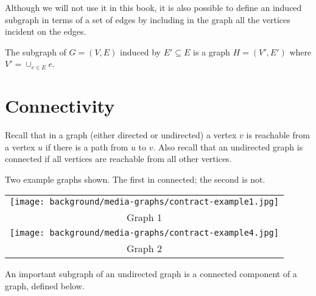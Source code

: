 \begin{cluster}
\label{grp:grm:bg::graphs::although}

\begin{gram}
\label{grm:bg::graphs::although}
Although we will not use it in this book, it is also possible to
define an induced subgraph in terms of a set of edges by including in
the graph all the vertices incident on the edges.

\end{gram}
\end{cluster}

\begin{cluster}
\label{grp:def:bg::graphs::subgraph::ei}

\begin{definition}
\label{def:bg::graphs::subgraph::ei}
The subgraph of $G = (V,E)$ induced by $E' \subseteq E$ is a graph $H
= (V',E')$ where $V' = \cup_{e \in E} e$.

\end{definition}
\end{cluster}


\section{Connectivity}
\label{sec:bg::graphs::connectivity}

\begin{cluster}
\label{grp:grm:bg::graphs::recall}

\begin{gram}
\label{grm:bg::graphs::recall}
Recall that in a graph (either directed or undirected) a vertex $v$ is
reachable from a vertex $u$ if there is a path from $u$ to $v$.  Also
recall that an undirected graph is connected if all vertices are
reachable from all other vertices. 

\end{gram}
\end{cluster}

\begin{cluster}
\label{grp:ex:gc-two-graphs}

\begin{example}
\label{ex:gc-two-graphs}
Two example graphs shown. The first in connected; the second is not.

\begin{tabular}{c}
\texttt{[image: background/media-graphs/contract-example1.jpg]}
\\
{Graph 1}
\\
\texttt{[image: background/media-graphs/contract-example4.jpg]}
\\
{Graph 2}
\end{tabular}

An important subgraph of an undirected graph is a connected component
of a graph, defined below.

\end{example}
\end{cluster}

